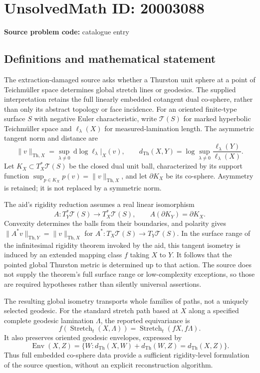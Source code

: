 \documentclass[11pt]{article}
\newcommand{\dd}{\,\mathrm{d}}
\begin{document}
\section*{UnsolvedMath ID: 20003088}
\textbf{Source problem code:} catalogue entry
\subsection{Definitions and mathematical statement}
The extraction-damaged source asks whether a Thurston unit sphere at a point of Teichm\"uller space determines global stretch lines or geodesics. The supplied interpretation retains the full linearly embedded cotangent dual co-sphere, rather than only its abstract topology or face incidence. For an oriented finite-type surface $S$ with negative Euler characteristic, write $\mathcal T(S)$ for marked hyperbolic Teichm\"uller space and $\ell_\lambda(X)$ for measured-lamination length. The asymmetric tangent norm and distance are
\[
\|v\|_{\mathrm{Th},X}=\sup_{\lambda\ne0}\dd\log\ell_\lambda|_X(v),\qquad
 d_{\mathrm{Th}}(X,Y)=\log\sup_{\lambda\ne0}\frac{\ell_\lambda(Y)}{\ell_\lambda(X)}.
\]
Let $K_X\subset T_X^*\mathcal T(S)$ be the closed dual unit ball, characterized by its support function $\sup_{p\in K_X}p(v)=\|v\|_{\mathrm{Th},X}$, and let $\partial K_X$ be its co-sphere. Asymmetry is retained; it is not replaced by a symmetric norm.

The aid's rigidity reduction assumes a real linear isomorphism
\[
A:T_Y^*\mathcal T(S)\longrightarrow T_X^*\mathcal T(S),\qquad
A(\partial K_Y)=\partial K_X.
\]
Convexity determines the balls from their boundaries, and polarity gives $\|A^*v\|_{\mathrm{Th},Y}=\|v\|_{\mathrm{Th},X}$ for $A^*:T_X\mathcal T(S)\to T_Y\mathcal T(S)$. In the surface range of the infinitesimal rigidity theorem invoked by the aid, this tangent isometry is induced by an extended mapping class $f$ taking $X$ to $Y$. It follows that the pointed global Thurston metric is determined up to that action. The source does not supply the theorem's full surface range or low-complexity exceptions, so those are required hypotheses rather than silently universal assertions.

The resulting global isometry transports whole families of paths, not a uniquely selected geodesic. For the standard stretch path based at $X$ along a specified complete geodesic lamination $\Lambda$, the reported equivariance is
\[
f(\operatorname{Stretch}_t(X,\Lambda))
=\operatorname{Stretch}_t(fX,f\Lambda).
\]
It also preserves oriented geodesic envelopes, expressed by
\[
\operatorname{Env}(X,Z)=\{W:d_{\mathrm{Th}}(X,W)+d_{\mathrm{Th}}(W,Z)=d_{\mathrm{Th}}(X,Z)\}.
\]
Thus full embedded co-sphere data provide a sufficient rigidity-level formulation of the source question, without an explicit reconstruction algorithm.
\end{document}
